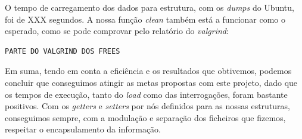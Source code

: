 \documentclass[a4paper, 11pt, oneside]{article}
\begin{document}
O tempo de carregamento dos dados para estrutura, com os \textit{dumps} do Ubuntu, foi de XXX segundos. A nossa função \textit{clean} também está a funcionar como o esperado, como se pode comprovar pelo relatório do \textit{valgrind}:
\begin{verbatim}
PARTE DO VALGRIND DOS FREES
\end{verbatim}

Em suma, tendo em conta a eficiência e os resultados que obtivemos, podemos concluir que conseguimos atingir as metas propostas com este projeto, dado que os tempos de execução, tanto do \textit{load} como das interrogações, foram bastante positivos. Com os \textit{getters} e \textit{setters} por nós definidos para as nossas estruturas, conseguimos sempre, com a modulação e separação dos ficheiros que fizemos, respeitar o encapsulamento da informação.
\end{document}
